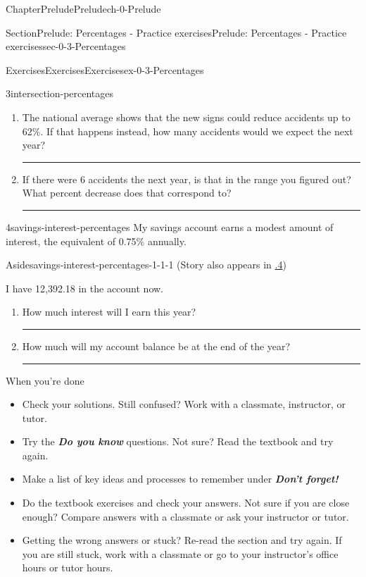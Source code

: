 \documentclass[twoside,11pt,]{book}
\newcommand{\xreffont}{\relax}
\newcommand{\alert}[1]{\textbf{\textit{#1}}}
\newlength{\workspacestrutwidth}
\numberwithin{equation}{section}
\begin{document}
\begin{chapterptx}{Chapter}{Prelude}{}{Prelude}{}{}{ch-0-Prelude}
\begin{sectionptx}{Section}{Prelude: Percentages - Practice exercises}{}{Prelude: Percentages - Practice exercises}{}{}{sec-0-3-Percentages}
\begin{exercises-subsection-numberless}{Exercises}{Exercises}{}{Exercises}{}{}{ex-0-3-Percentages}
\begin{divisionexercise}{3}{}{}{intersection-percentages}
\begin{enumerate}[label=(\alph*),ref=\alph*]
\item{}The national average shows that the new signs could reduce accidents up to 62\%. If that happens instead, how many accidents would we expect the next year?%
\par\rule{\workspacestrutwidth}{1in}%
\item{}If there were 6 accidents the next year, is that in the range you figured out? What percent decrease does that correspond to?%
\par\rule{\workspacestrutwidth}{1in}%
\end{enumerate}%
\end{divisionexercise}%
 \begin{divisionexercise}{4}{}{}{savings-interest-percentages}%
My savings account earns a modest amount of interest, the equivalent of 0.75\% annually. \begin{aside}{Aside}{}{savings-interest-percentages-1-1-1}%
(Story also appears in \hyperlink{savings-interest-first-look-exponential}{{\xreffont 2.2.4}})%
\end{aside}
 I have \textdollar{}12,392.18 in the account now.%
\begin{enumerate}[label=(\alph*),ref=\alph*]%
\item{}How much interest will I earn this year?%
\par\rule{\workspacestrutwidth}{1in}%
\item{}How much will my account balance be at the end of the year?%
\par\rule{\workspacestrutwidth}{1in}%
\end{enumerate}%
\end{divisionexercise}%
\end{exercises-subsection-numberless}
\begin{conclusion}{When you're done \textellipsis{}}%
%
\begin{itemize}[label=\textbullet]
\item{}Check your solutions. Still confused? Work with a classmate, instructor, or tutor.%
\item{}Try the \alert{Do you know} questions. Not sure? Read the textbook and try again.%
\item{}Make a list of key ideas and processes to remember under \alert{Don't forget!}%
\item{}Do the textbook exercises and check your answers. Not sure if you are close enough? Compare answers with a classmate or ask your instructor or tutor.%
\item{}Getting the wrong answers or stuck? Re-read the section and try again. If you are still stuck, work with a classmate or go to your instructor's office hours or tutor hours.%

\end{itemize}
\end{conclusion}
\end{sectionptx}
\end{chapterptx}
\end{document}
